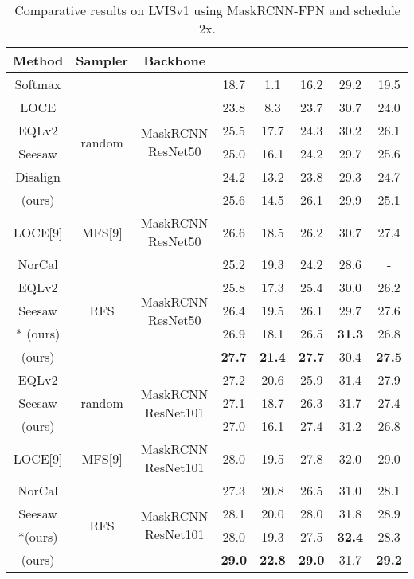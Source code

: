 \documentclass[runningheads]{llncs}
\begin{document}
\begin{table}
    \centering
    \caption{Comparative results on LVISv1 using MaskRCNN-FPN and schedule 2x.}
    \begin{tabular}{c|c|c|c|c|c|c|c}
         Method&Sampler&Backbone & &&&& \\
         \hline
         Softmax&\multirow{6}{*}{random}&\multirow{6}{*}{MaskRCNN ResNet50}&18.7&1.1&16.2&29.2&19.5\\
         LOCE\cite{feng2021exploring}&&&23.8 &8.3 &23.7&30.7&24.0\\
         EQLv2\cite{tan2021equalization}&& &25.5&17.7&24.3&30.2&26.1\\
         Seesaw\cite{wang2021seesaw}&& &25.0 &16.1 &24.2&29.7&25.6\\
         Disalign\cite{zhang2021distribution}&&&24.2&13.2&23.8&29.3&24.7\\
          (ours)&&&25.6&14.5&26.1&29.9&25.1\\
         \hline
          LOCE[9]&MFS[9]&MaskRCNN ResNet50 &26.6 &18.5 &26.2&30.7&27.4\\
         \hline
         NorCal\cite{pan2021model}&\multirow{5}{*}{RFS}&\multirow{5}{*}{MaskRCNN ResNet50}&25.2&19.3&24.2&28.6&-\\
         EQLv2\cite{tan2021equalization}&&&25.8 &17.3 &25.4&30.0&26.2\\
         Seesaw\cite{wang2021seesaw}&&&26.4 &19.5&26.1&29.7&27.6\\
         * (ours)& &&26.9&18.1&26.5&\textbf{31.3}&26.8\\
          (ours)&& &\textbf{27.7}&\textbf{21.4}&\textbf{27.7}&30.4&\textbf{27.5}\\
         \hline
         EQLv2\cite{tan2021equalization}&\multirow{3}{*}{random}&\multirow{3}{*}{MaskRCNN ResNet101}&27.2&20.6&25.9&31.4&27.9\\
         Seesaw\cite{wang2021seesaw}&&&27.1&18.7&26.3&31.7&27.4\\
          (ours)&&&27.0&16.1&27.4&31.2&26.8\\
         \hline
         LOCE[9]&MFS[9]&MaskRCNN ResNet101&28.0 &19.5 &27.8&32.0&29.0\\
         \hline
         NorCal\cite{pan2021model}&\multirow{4}{*}{RFS}&\multirow{4}{*}{MaskRCNN ResNet101}&27.3&20.8&26.5&31.0&28.1\\
         Seesaw\cite{wang2021seesaw}&&&28.1&20.0&28.0&31.8&28.9\\
         *(ours)&&&28.0&19.3&27.5&\textbf{32.4}&28.3\\
         (ours)&&&\textbf{29.0}&\textbf{22.8}&\textbf{29.0}&31.7&\textbf{29.2}\\
         
    \end{tabular}
    \label{tab:deep_models}
\end{table}
\end{document}
